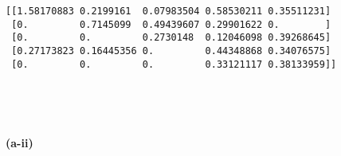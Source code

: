 \documentclass[11pt]{article}
\begin{document}
    \begin{Verbatim}[commandchars=\\\{\}]
[[1.58170883 0.2199161  0.07983504 0.58530211 0.35511231]
 [0.         0.7145099  0.49439607 0.29901622 0.        ]
 [0.         0.         0.2730148  0.12046098 0.39268645]
 [0.27173823 0.16445356 0.         0.44348868 0.34076575]
 [0.         0.         0.         0.33121117 0.38133959]]

    \end{Verbatim}

    \begin{center}
    \end{center}
    { \hspace*{\fill} \\}
    
    \begin{center}
    \end{center}
    { \hspace*{\fill} \\}
    
    \textbf{(a-ii)}
\end{document}
